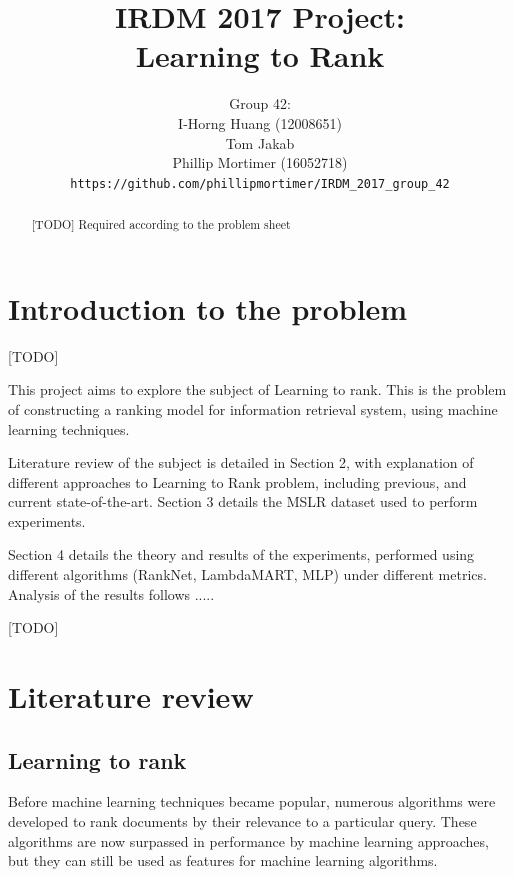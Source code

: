 \documentclass[english]{article}
\theoremstyle{definition}
\begin{document}
\title{IRDM 2017 Project:\\Learning to Rank
}
\author{Group 42:\\
I-Horng Huang (12008651) \\
Tom Jakab\\
Phillip Mortimer (16052718)\\
\texttt{https://github.com/phillipmortimer/IRDM\_2017\_group\_42}}
\maketitle


\begin{abstract}
[TODO]
Required according to the problem sheet

\end{abstract}
\begin{multicols}{2}
\section{Introduction to the problem}
[TODO]


This project aims to explore the subject of Learning to rank. This is the problem of constructing a ranking model for information retrieval system, using machine learning techniques. 

Literature review of the subject is detailed in Section 2, with explanation of different approaches to Learning to Rank problem, including previous, and current state-of-the-art. Section 3 details the MSLR dataset used to perform experiments. 

Section 4 details the theory and results of the experiments, performed using different algorithms (RankNet, LambdaMART, MLP) under different metrics. Analysis of the results follows ..... 

[TODO]



\section{Literature review}

\subsection{Learning to rank}

Before machine learning techniques became popular, numerous algorithms were developed to rank documents by their relevance to a particular query.  These algorithms are now surpassed in performance by machine learning approaches, but they can still be used as features for machine learning algorithms.


\end{multicols}
\end{document}
